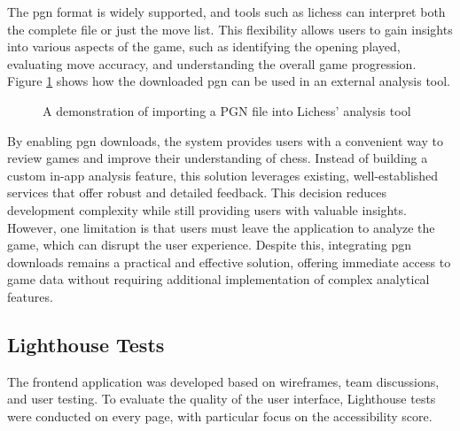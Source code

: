 The \gls{pgn} format is widely supported, and tools such as lichess can interpret both the complete file or just the move list. This flexibility allows users to gain insights into various aspects of the game, such as identifying the opening played, evaluating move accuracy, and understanding the overall game progression. Figure \ref{fig:downloaded-pgn-analysis} shows how the downloaded \gls{pgn} can be used in an external analysis tool. \\

\begin{figure}[h!] \centering {}\caption[Lichess analysis tool]{A demonstration of importing a PGN file into Lichess' analysis tool}\label{fig:downloaded-pgn-analysis} \end{figure}

By enabling \gls{pgn} downloads, the system provides users with a convenient way to review games and improve their understanding of chess. Instead of building a custom in-app analysis feature, this solution leverages existing, well-established services that offer robust and detailed feedback. This decision reduces development complexity while still providing users with valuable insights. \\

However, one limitation is that users must leave the application to analyze the game, which can disrupt the user experience. Despite this, integrating \gls{pgn} downloads remains a practical and effective solution, offering immediate access to game data without requiring additional implementation of complex analytical features.

\subsection{Lighthouse Tests}
The frontend application was developed based on wireframes, team discussions, and user testing. To evaluate the quality of the user interface, Lighthouse tests were conducted on every page, with particular focus on the accessibility score. \\

